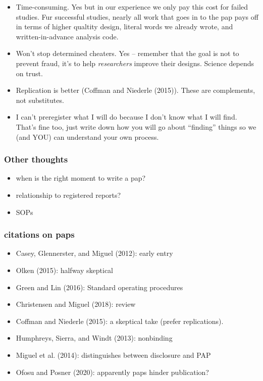 \documentclass[
]{article}
\providecommand{\tightlist}{%
  \setlength{\itemsep}{0pt}\setlength{\parskip}{0pt}}
\begin{document}
\begin{itemize}
\item
  Time-consuming. Yes but in our experience we only pay this cost for
  failed studies. Fur successful studies, nearly all work that goes in
  to the pap pays off in terms of higher qualtity design, literal words
  we already wrote, and written-in-advance analysis code.
\item
  Won't stop determined cheaters. Yes -- remember that the goal is not
  to prevent fraud, it's to help \emph{researchers} improve their
  designs. Science depends on trust.
\item
  Replication is better (Coffman and Niederle (2015)). These are
  complements, not substitutes.
\item
  I can't preregister what I will do because I don't know what I will
  find. That's fine too, just write down how you will go about
  ``finding'' things so we (and YOU) can understand your own process.
\end{itemize}

\hypertarget{other-thoughts}{%
\subsubsection{Other thoughts}\label{other-thoughts}}

\begin{itemize}
\tightlist
\item
  when is the right moment to write a pap?
\item
  relationship to registered reports?
\item
  SOPs
\end{itemize}

\hypertarget{citations-on-paps}{%
\subsubsection{citations on paps}\label{citations-on-paps}}

\begin{itemize}
\tightlist
\item
  Casey, Glennerster, and Miguel (2012): early entry
\item
  Olken (2015): halfway skeptical
\item
  Green and Lin (2016): Standard operating procedures
\item
  Christensen and Miguel (2018): review
\item
  Coffman and Niederle (2015): a skeptical take (prefer replications).
\item
  Humphreys, Sierra, and Windt (2013): nonbinding
\item
  Miguel et al. (2014): distinguishes between disclosure and PAP
\item
  Ofosu and Posner (2020): apparently paps hinder publication?
\end{itemize}
\end{document}

